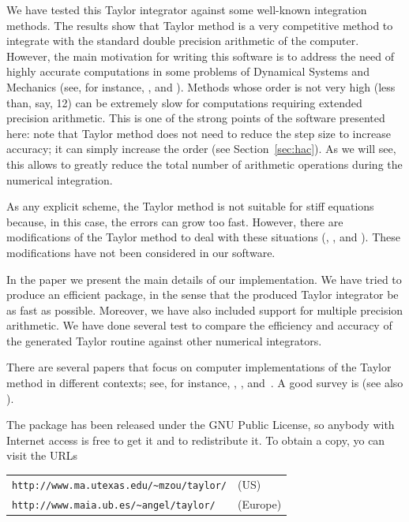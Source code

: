 \documentclass[12pt,twoside]{article}
\begin{document}
We have tested this Taylor integrator against some well-known
integration methods. The results show that Taylor method is a very
competitive method to integrate with the standard double precision
arithmetic of the computer. However, the main motivation for writing
this software is to address the need of highly accurate computations
in some problems of Dynamical Systems and Mechanics (see, for
instance, \cite{MartinezS99}, \cite{SimoV01a} and
\cite{Simo01}). Methods whose order is not very high (less than, say,
12) can be extremely slow for computations requiring extended
precision arithmetic. This is one of the strong points of the software
presented here: note that Taylor method does not need to reduce the
step size to increase accuracy; it can simply increase the order (see
Section~\ref{sec:hac}). As we will see, this allows to greatly reduce
the total number of arithmetic operations during the numerical
integration.

As any explicit scheme, the Taylor method is not suitable for stiff
equations because, in this case, the errors can grow too fast.
However, there are modifications of the Taylor method to deal with
these situations (\cite{Bart80a}, \cite{JalbertZ85},
\cite{KirlingerC92} and \cite{CorlissGHKPS97}). These modifications
have not been considered in our software.

In the paper we present the main details of our implementation. We
have tried to produce an efficient package, in the sense that the
produced Taylor integrator be as fast as possible. Moreover, we have
also included support for multiple precision arithmetic. We have done
several test to compare the efficiency and accuracy of the generated
Taylor routine against other numerical integrators.

There are several papers that focus on computer implementations of the
Taylor method in different contexts; see, for instance,
\cite{BartWZ70a}, \cite{CorlissC82}, \cite{ChangC94}
and~\cite{Hoefkens01}.  A good survey is \cite{NedialkovJC99} (see
also \cite{Corliss95}).

The package has been released under the GNU Public License, so
anybody with Internet access is free to get it and to redistribute
it. To obtain a copy, yo can visit the URLs

\begin{tabular}{ll}
\verb-http://www.ma.utexas.edu/~mzou/taylor/-  & (US)\\
\verb-http://www.maia.ub.es/~angel/taylor/-  & (Europe)
\end{tabular}
\end{document}
